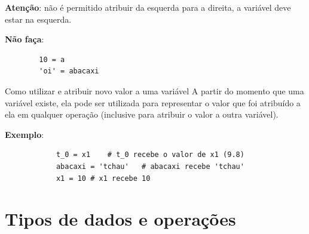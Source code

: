 \begin{frame}[containsverbatim]
	\Large	
	
	\textbf{Atenção}: 
	não é permitido atribuir da esquerda para a direita, a variável deve estar na esquerda.   
		
	\textbf{Não faça}:
	\begin{verbatim}
		10 = a 	
		'oi' = abacaxi 
	\end{verbatim}	
\end{frame}

\begin{frame}[containsverbatim]{Como utilizar e atribuir novo valor a uma variável}
	A partir do momento que uma variável existe, ela pode ser utilizada para representar o valor que foi atribuído a ela em qualquer operação (inclusive para atribuir o valor a outra variável).
	
	\textbf{Exemplo}:	
		\begin{verbatim}
			t_0 = x1	# t_0 recebe o valor de x1 (9.8)			
			abacaxi = 'tchau'	# abacaxi recebe 'tchau'												
			x1 = 10	# x1 recebe 10
		\end{verbatim}	
  \end{frame}	
  

\section{Tipos de dados e operações}


